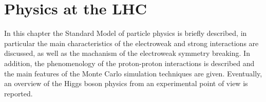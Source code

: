 \chapter{Physics at the LHC}\label{chap1}
\thispagestyle{empty}

In this chapter the Standard Model of particle physics is briefly described, in particular the main characteristics of the electroweak and strong interactions are discussed, as well as the machanism of the electroweak symmetry breaking.
In addition, the phenomenology of the proton-proton interactions is described and the main features of the Monte Carlo simulation techniques are given.
Eventually, an overview of the Higgs boson physics from an experimental point of view is reported.


%
%


%
%

